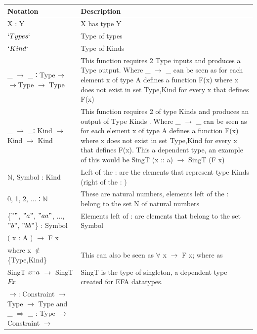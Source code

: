 \documentclass[12pt]{report}
\begin{document}
\begin{longtable}{|m{5cm}|m{9cm}| }
    \hline 
    \textbf{Notation}  & \textbf{Description} \\ \hline
       X : Y   &  X has type Y \\ 
        \hline  
       $`Types`$  &  Type of types \\ 
        \hline
       $`Kind`$   &  Type of Kinds \\ 
        \hline
         \_ $\rightarrow$ \_ ∶ Type →$\rightarrow$Type $\rightarrow$ Type  & 
         This function requires 2 Type inputs and produces a Type output. Where 
         \_ $\rightarrow$ \_ can be seen as for each element x of type A 
         defines a function F(x) where x does not exist in set {Type,Kind} for 
         every x that defines F(x)  \\ 
        \hline
       \_ $\rightarrow$ \_∶ Kind $\rightarrow$Kind $\rightarrow$ Kind  & This 
       function requires 2 of type Kinds and produces an output of Type Kinds . 
       Where 
       \_ $\rightarrow$ \_ can be seen as for each element x of type A 
       defines a function F(x) where x does not exist in set {Type,Kind} for 
       every x that defines F(x). This a dependent type, an example of this 
       would be 
       SingT (x :: a) $\rightarrow$ SingT (F x)
       \\ 
        \hline
          $\mathbb{N}$, Symbol : Kind   &  Left of the : are the elements that 
          represent type Kinds (right of the : )\\ 
        \hline
          0, 1, 2, $...$ ∶ $\mathbb{N}$   &  These are natural numbers, 
          elements left of the : belong to the set N of natural numbers\\ 
        \hline
         \{$""$, $"a"$, $"aa"$, $...$, $"b"$, $"bb"$\} : Symbol &  
         Elements left of : are elements that belong to the set Symbol \\ 
        \hline
        ( x : A  ) $\rightarrow$ F x   & \\ where x $\notin$ \{Type,Kind\}   &  
        This can also be seen as $\forall$ x $\rightarrow$ F x; where as  \\ 
        \hline
           SingT \(x $::$ a\) $\rightarrow$ SingT \(F x\)  &  SingT is the type 
           of singleton, a dependent type created for EFA datatypes. \\ 
        \hline
          $\rightarrow$: Constraint $\rightarrow$ Type $\rightarrow$ Type  and  
          \_ $\Rightarrow$ \_ : Type $\rightarrow$ Constraint $\rightarrow$ 

\end{longtable}
\end{document}
